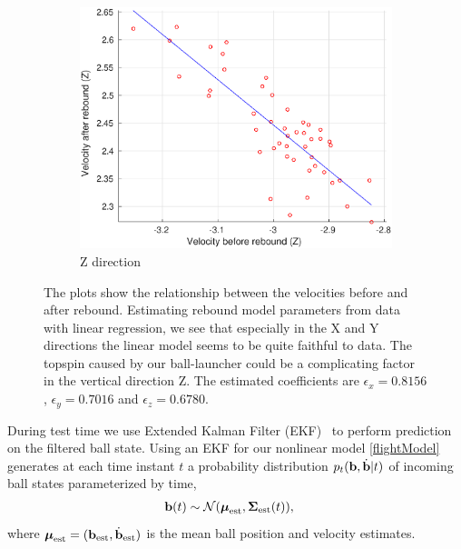 \begin{figure}
\begin{subfigure}[b]{0.16\textwidth}
      \includegraphics[width=\textwidth]{velZRebound.eps}
      \caption{Z direction}
      \label{fig:2}
    \end{subfigure}
  \caption{The plots show the relationship between the velocities before and after rebound. Estimating rebound model parameters from data with linear regression, we see that especially in the X and Y directions the linear model seems to be quite faithful to data. The topspin caused by our ball-launcher could be a complicating factor in the vertical direction Z. The estimated coefficients are $\epsilon_x = 0.8156$, $\epsilon_y = 0.7016$ and $\epsilon_z = 0.6780$.}
  \label{fig:rebound}
\end{figure}


During test time we use Extended Kalman Filter (EKF)~\cite{Sorenson85} to perform prediction on the filtered ball state. 
Using an EKF for our nonlinear model \eqref{flightModel} generates at each time instant $t$ a probability distribution $p_t(\boldsymbol{\mathrm{b}},\dot{\boldsymbol{\mathrm{b}}}|t)$ of incoming ball states parameterized by time, 
%
\begin{align}
\boldsymbol{\mathrm{b}}(t) &\sim \mathcal{N}(\boldsymbol{\mathrm{\mu}}_{\mathrm{est}},\boldsymbol{\mathrm{\Sigma}}_{\mathrm{est}}(t)),
\label{ballProcess}
\end{align}
%
\noindent where $\boldsymbol{\mathrm{\mu}}_{\mathrm{est}} = (\boldsymbol{\mathrm{b}}_{\mathrm{est}},\dot{\boldsymbol{\mathrm{b}}}_{\mathrm{est}})$ is the mean ball position and velocity estimates.

